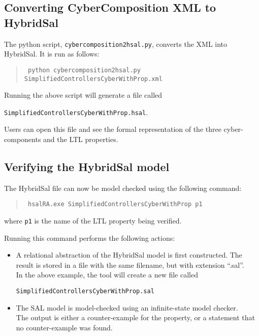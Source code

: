 \documentclass{llncs}
\begin{document}
\subsection{Converting CyberComposition XML to HybridSal}

The python script, {\tt{cybercomposition2hsal.py}},
converts the XML into HybridSal.
It is run as follows:

\begin{quote}
  {\tt{
      python cybercomposition2hsal.py SimplifiedControllersCyberWithProp.xml
  }}
\end{quote}

Running the above script will generate a file called
\begin{center}
{\tt{SimplifiedControllersCyberWithProp.hsal}}.
\end{center}

Users can open this file and see the formal representation
of the three cyber-components and the LTL properties.

\subsection{Verifying the HybridSal model}

The HybridSal file can now be model checked
using the following command:
\begin{quote}
  {\tt{
      hsalRA.exe SimplifiedControllersCyberWithProp p1
  }}
\end{quote}
where {\tt{p1}} is the name of the LTL property being verified.

Running this command performs the following actions:
\begin{itemize}
  \item A relational abstraction of the HybridSal model
    is first constructed. The result is stored in a file
    with the same filename, but with extension ``.sal''.
    \\
    In the above example, the tool will create a new file
    called 
    \begin{center}
      {\tt{SimplifiedControllersCyberWithProp.sal}}
    \end{center}
  \item The SAL model is model-checked using an infinite-state
    model checker.
    \\
    The output is either a counter-example for the property,
    or a statement that no counter-example was found.
\end{itemize}
\end{document}
